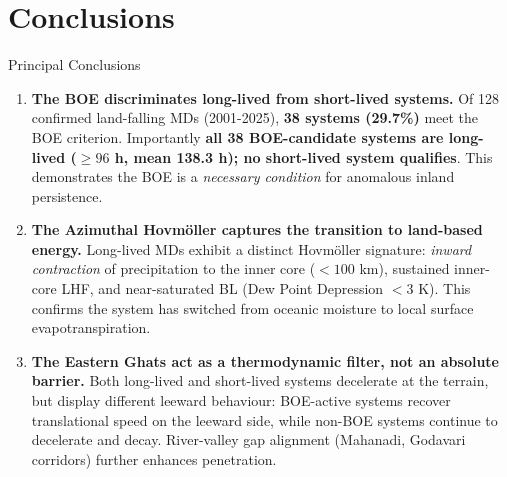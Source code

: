 \documentclass[aspectratio=169,t,xcolor=table]{beamer}
\begin{document}
\section{Conclusions}

\begin{frame}{Principal Conclusions}
  \footnotesize
  \begin{enumerate}
    \item \textbf{The BOE discriminates long-lived from short-lived systems.}
      Of 128 confirmed land-falling MDs (2001-2025), \textbf{38
      systems (29.7\%)} meet the BOE criterion. Importantly \textbf{all
        38 BOE-candidate systems are long-lived ($\geq 96$ h, mean 138.3
      h); no short-lived system qualifies}. This demonstrates the BOE
      is a \textit{necessary condition} for anomalous inland persistence.

      \vspace{0.2cm}

    \item \textbf{The Azimuthal Hovmöller captures the transition
      to land-based energy.}
      Long-lived MDs exhibit a distinct Hovmöller signature:
      \textit{inward contraction} of precipitation to the inner core
      ($<100$ km), sustained inner-core LHF, and near-saturated BL (Dew
      Point Depression $<3$ K). This confirms the system has switched
      from oceanic moisture to local surface evapotranspiration.

      \vspace{0.2cm}

    \item \textbf{The Eastern Ghats act as a thermodynamic filter,
      not an absolute barrier.}
      Both long-lived and short-lived systems decelerate at the
      terrain, but display different leeward behaviour: BOE-active
      systems recover translational speed on the leeward side, while
      non-BOE systems continue to decelerate and decay. River-valley
      gap alignment (Mahanadi, Godavari corridors) further
      enhances penetration.
  \end{enumerate}
\end{frame}
\end{document}
